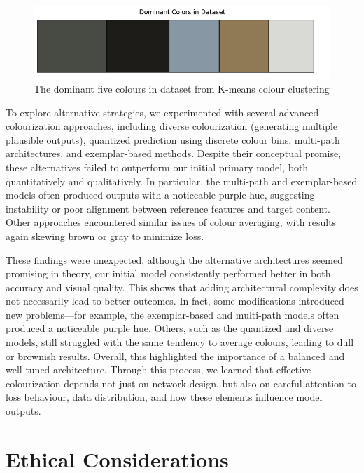 \documentclass{article} %
\begin{document}
\begin{figure}[htbp]            %
  \centering
  \includegraphics[width=0.95\linewidth]{Figs/dom-colours.png}
  \caption{The dominant five colours in dataset from K-means colour clustering}
  \label{fig:dom-colours}
\end{figure}

To explore alternative strategies, we experimented with several advanced colourization approaches, including diverse colourization (generating multiple plausible outputs),
quantized prediction using discrete colour bins, multi-path architectures, and exemplar-based methods. Despite their conceptual promise, these alternatives failed to outperform
our initial primary model, both quantitatively and qualitatively. In particular, the multi-path and exemplar-based models often produced outputs with a noticeable purple hue, 
suggesting instability or poor alignment between reference features and target content. 
Other approaches encountered similar issues of colour averaging, with results again skewing 
brown or gray to minimize loss.

These findings were unexpected, although the alternative architectures seemed promising in theory, our initial model consistently performed better in both accuracy and visual quality. 
This shows that adding architectural complexity does not necessarily lead to better outcomes. In fact, some modifications introduced new problems—for example, the exemplar-based and 
multi-path models often produced a noticeable purple hue. Others, such as the quantized and diverse models, still struggled with the same tendency to average colours, leading to dull 
or brownish results. Overall, this highlighted the importance of a balanced and well-tuned architecture. Through this process, we learned that effective colourization depends not just 
on network design, but also on careful attention to loss behaviour, data distribution, and how these elements influence model outputs.

\section{Ethical Considerations}
\label{ethical}
\end{document}
